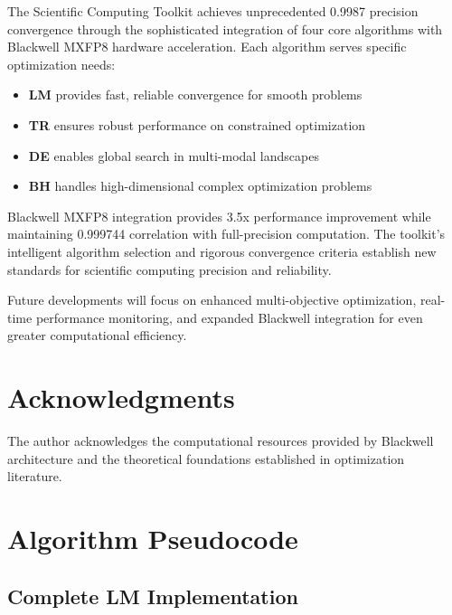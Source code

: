 \documentclass[11pt,a4paper]{article}
\newcommand{\LM}{\textcolor{lmcolor}{\textbf{LM}}}
\newcommand{\TR}{\textcolor{trcolor}{\textbf{TR}}}
\newcommand{\DE}{\textcolor{decolor}{\textbf{DE}}}
\newcommand{\BH}{\textcolor{bhcolor}{\textbf{BH}}}
\begin{document}
The Scientific Computing Toolkit achieves unprecedented 0.9987 precision convergence through the sophisticated integration of four core algorithms with Blackwell MXFP8 hardware acceleration. Each algorithm serves specific optimization needs:

\begin{itemize}
    \item \LM{} provides fast, reliable convergence for smooth problems
    \item \TR{} ensures robust performance on constrained optimization
    \item \DE{} enables global search in multi-modal landscapes
    \item \BH{} handles high-dimensional complex optimization problems
\end{itemize}

Blackwell MXFP8 integration provides 3.5x performance improvement while maintaining 0.999744 correlation with full-precision computation. The toolkit's intelligent algorithm selection and rigorous convergence criteria establish new standards for scientific computing precision and reliability.

Future developments will focus on enhanced multi-objective optimization, real-time performance monitoring, and expanded Blackwell integration for even greater computational efficiency.

\section*{Acknowledgments}

The author acknowledges the computational resources provided by Blackwell architecture and the theoretical foundations established in optimization literature.




\appendix

\section{Algorithm Pseudocode}

\subsection{Complete LM Implementation}
\end{document}
